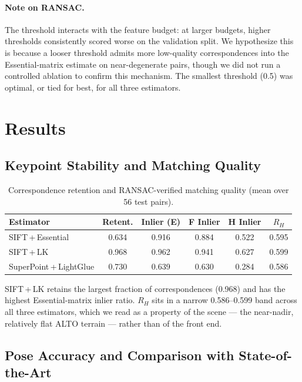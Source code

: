 \documentclass[11pt,a4paper]{article}
\begin{document}
\paragraph{Note on RANSAC.}
The threshold interacts with the feature budget: at larger budgets,
higher thresholds consistently scored worse on the validation split.
We hypothesize this is because a looser threshold admits more
low-quality correspondences into the Essential-matrix estimate on
near-degenerate pairs, though we did not run a controlled ablation to
confirm this mechanism. The smallest threshold (0.5) was optimal, or
tied for best, for all three estimators.

\section{Results}

\subsection{Keypoint Stability and Matching Quality}

\begin{table}[H]
\centering
\begin{tabular}{@{}lccccc@{}}
\toprule
\textbf{Estimator} & \textbf{Retent.} & \textbf{Inlier (E)} & \textbf{F Inlier} & \textbf{H Inlier} & $R_H$ \\
\midrule
SIFT\,+\,Essential       & 0.634 & 0.916 & 0.884 & 0.522 & 0.595 \\
SIFT\,+\,LK              & 0.968 & 0.962 & 0.941 & 0.627 & 0.599 \\
SuperPoint\,+\,LightGlue & 0.730 & 0.639 & 0.630 & 0.284 & 0.586 \\
\bottomrule
\end{tabular}
\caption{Correspondence retention and RANSAC-verified matching quality (mean over 56 test pairs).}
\label{tab:matching}
\end{table}

SIFT\,+\,LK retains the largest fraction of correspondences (0.968)
and has the highest Essential-matrix inlier ratio. $R_H$ sits in a
narrow 0.586--0.599 band across all three estimators, which we read as
a property of the scene --- the near-nadir, relatively flat ALTO
terrain --- rather than of the front end.

\subsection{Pose Accuracy and Comparison with State-of-the-Art}
\end{document}
